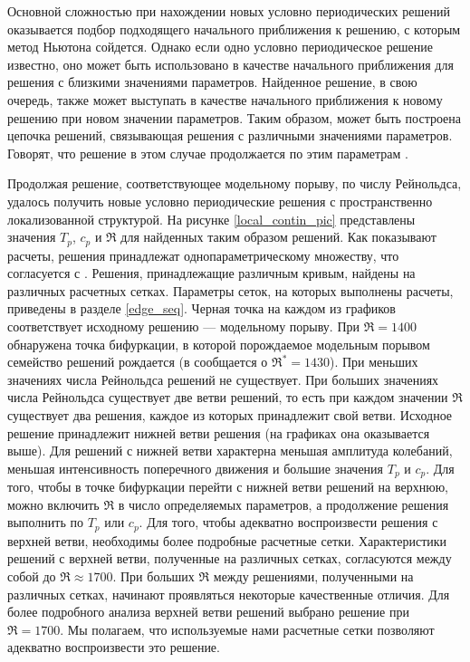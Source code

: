 Основной сложностью при нахождении новых условно периодических решений оказывается подбор подходящего начального приближения к решению, с которым метод Ньютона сойдется. Однако если одно условно периодическое решение известно, оно может быть использовано в качестве начального приближения для решения с близкими значениями параметров. Найденное решение, в свою очередь, также может выступать в качестве начального приближения к новому решению при новом значении параметров. Таким образом, может быть построена цепочка решений, связывающая решения с различными значениями параметров. Говорят, что решение в этом случае продолжается по этим параметрам \cite{Viswanath2007, Dijkstra2014}. 

Продолжая решение, соответствующее модельному порыву, по числу Рейнольдса, удалось получить новые условно периодические решения с пространственно локализованной структурой. На рисунке \ref{local_contin_pic} представлены значения $T_p$, $c_p$ и $\Re$ для найденных таким образом решений. Как показывают расчеты, решения принадлежат однопараметрическому множеству, что согласуется с \cite{Avila2013}. Решения, принадлежащие различным кривым, найдены на различных расчетных сетках. Параметры сеток, на которых выполнены расчеты, приведены в разделе \ref{edge_seq}. Черная точка на каждом из графиков соответствует исходному решению --- модельному порыву. При $\Re = 1400$ обнаружена точка бифуркации, в которой порождаемое модельным порывом семейство решений рождается (в \cite{Avila2013} сообщается о $\Re^* = 1430$). При меньших значениях числа Рейнольдса решений не существует. При больших значениях числа Рейнольдса существует две ветви решений, то есть при каждом значении $\Re$ существует два решения, каждое из которых принадлежит свой ветви. Исходное решение принадлежит нижней ветви решения (на графиках она оказывается выше). Для решений с нижней ветви характерна меньшая амплитуда колебаний, меньшая интенсивность поперечного движения и большие значения $T_p$ и $c_p$. Для того, чтобы в точке бифуркации перейти с нижней ветви решений на верхнюю, можно включить $\Re$ в число определяемых параметров, а продолжение решения выполнить по $T_p$ или $c_p$. Для того, чтобы адекватно воспроизвести решения с верхней ветви, необходимы более подробные расчетные сетки. Характеристики решений с верхней ветви, полученные на различных сетках, согласуются между собой до $\Re \approx 1700$. При больших $\Re$ между решениями, полученными на различных сетках, начинают проявляться некоторые качественные отличия. Для более подробного анализа верхней ветви решений выбрано решение при $\Re = 1700$. Мы полагаем, что используемые нами расчетные сетки позволяют адекватно воспроизвести это решение. 


